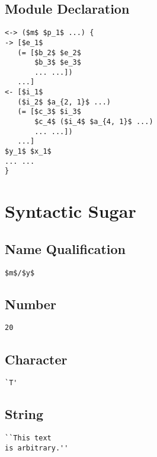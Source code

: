 \documentclass{article}
\begin{document}
\begin{multicols}
\subsection*{Module Declaration}
\begin{lstlisting}[mathescape]
<-> ($m$ $p_1$ ...) {
-> [$e_1$
   (= [$b_2$ $e_2$
       $b_3$ $e_3$
       ... ...])
   ...]
<- [$i_1$
   ($i_2$ $a_{2, 1}$ ...)
   (= [$c_3$ $i_3$
       $c_4$ ($i_4$ $a_{4, 1}$ ...)
       ... ...])
   ...]
$y_1$ $x_1$
... ...
}
\end{lstlisting}

\columnbreak

\section*{Syntactic Sugar}

\subsection*{Name Qualification}
\begin{lstlisting}[mathescape]
$m$/$y$
\end{lstlisting}

\subsection*{Number}
\begin{lstlisting}[mathescape]
20
\end{lstlisting}

\subsection*{Character}
\begin{lstlisting}[mathescape]
`T'
\end{lstlisting}

\subsection*{String}
\begin{lstlisting}[mathescape]
``This text
is arbitrary.''
\end{lstlisting}


\end{multicols}
\end{document}
